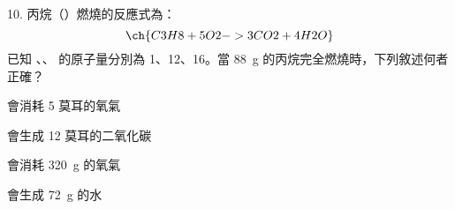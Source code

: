 \documentclass[12pt]{article}
\begin{document}
\begin{problem}[widest=10]
  \item[10.] 丙烷（）燃燒的反應式為：
  \begin{equation*}
    \ch{C3H8 + 5 O2 -> 3 CO2 + 4 H2O}
  \end{equation*}
  已知 、、 的原子量分別為 1、12、16。當 \qty{88}{g} 的丙烷完全燃燒時，下列敘述何者正確？
  \begin{choices}
    \item 會消耗 5 莫耳的氧氣
    \item 會生成 12 莫耳的二氧化碳
    \item 會消耗 \qty{320}{g} 的氧氣
    \item 會生成 \qty{72}{g} 的水
  \end{choices}
\end{problem}
\end{document}
